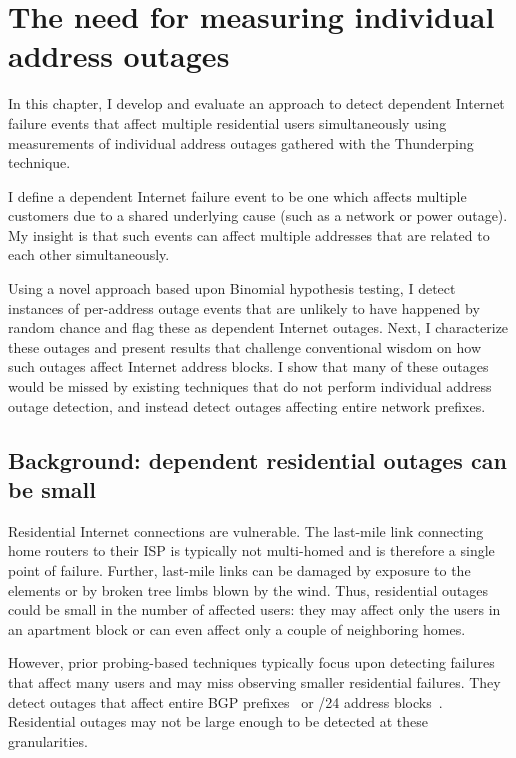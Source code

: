 
\chapter{The need for measuring individual address outages}
\label{cpt:corrfails}

In this chapter, I develop and evaluate an approach to detect
dependent Internet failure events that affect multiple residential
users simultaneously using measurements of individual address outages
gathered with the Thunderping technique. 

I define a dependent Internet failure event to be one which affects
multiple customers due to a shared underlying cause (such as a network
or power outage). My insight is that such events can affect multiple
addresses that are related to each other simultaneously.

Using a novel approach based
upon Binomial hypothesis testing, I detect instances of per-address
outage events that are unlikely to have happened by random chance and
flag these as dependent Internet outages. Next, I characterize these
outages and present results that challenge conventional wisdom on how
such outages affect Internet address blocks. I show that many of these
outages would be missed by existing techniques that do not perform individual
address outage detection, and instead detect outages affecting entire
network prefixes.


\section{Background: dependent residential outages can be small}

Residential Internet connections are vulnerable. The last-mile link
connecting home routers to their ISP is typically not multi-homed and
is therefore a single point of failure. Further, last-mile links can
be damaged by exposure to the elements or by broken tree limbs blown
by the wind. Thus, residential outages could be small in the number of
affected users: they may affect only the users in an apartment block
or can even affect only a couple of neighboring homes.


However, prior probing-based techniques typically focus upon detecting failures
that affect many users and may miss observing smaller residential
failures.  They detect outages that affect entire BGP
prefixes~\cite{hubble} or /24 address
blocks~\cite{trinocular}. Residential outages may not be large enough
to be detected at these granularities.

